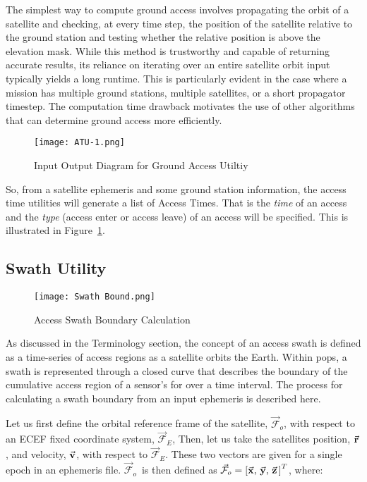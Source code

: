 The simplest way to compute ground access involves propagating the orbit of a
satellite and checking, at every time step, the position of the satellite
relative to the ground station and testing whether the relative position is
above the elevation mask. While this method is trustworthy and capable of
returning accurate results, its reliance on iterating over an entire satellite
orbit input typically yields a long runtime. This is particularly evident in
the case where a mission has multiple ground stations, multiple satellites, or
a short propagator timestep. The computation time drawback motivates the use of
other algorithms that can determine ground access more efficiently.

\begin{figure}[h]
    \centering
    \texttt{[image: ATU-1.png]} 
    \caption{Input Output Diagram for Ground Access Utiltiy}
    \label{fig:atu-1} 
\end{figure}

So, from a satellite ephemeris and some ground station information, the access
time utilities will generate a list of Access Times. That is the \textit{time}
of an access and the \textit{type} (access enter or access leave) of an access
will be specified. This is illustrated in Figure~\ref{fig:atu-1}.

\subsection {Swath Utility}

\begin{figure}
    \centering
    \texttt{[image: Swath Bound.png]} 
    \caption{Access Swath Boundary Calculation}
    \label{fig:swath-bound} 
\end{figure}

As discussed in the Terminology section, the concept of an access swath is
defined as a time-series of access regions as a satellite orbits the Earth.
Within \gls{pops}, a swath is represented through a closed curve that describes
the boundary of the cumulative access region of a sensor’s \gls{for} over a
time interval. The process for calculating a swath boundary from an input
ephemeris is described here.  

\newcommand{\Fo}{$\vec{\mathcal{F}}_o$} 
\newcommand{\Fe}{$\vec{\mathcal{F}}_E$}

Let us first define the orbital reference frame of the satellite, \Fo, with
respect to an ECEF fixed coordinate system, \Fe,  Then, let us take the
satellites position, $\vec{\bm{\mathrm{r}}}$, and velocity, $\vec{\bm{\mathrm{v}}}$, with respect to \Fe.
These two vectors are given for a single epoch in an ephemeris file. \Fo ~is
then defined as $ \vec{\mathcal{F}}_o = \left[ \vec{\bm{\mathrm{x}}}, \, \vec{\bm{\mathrm{y}}}, \, \vec{\bm{\mathrm{z}}}
\, \right]^T$, where:


